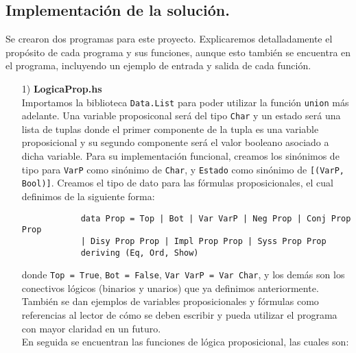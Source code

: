 \documentclass[letterpaper,11pt]{article}
\begin{document}
    \subsection{Implementación de la solución.}
    Se crearon dos programas para este proyecto. Explicaremos detalladamente el 
    propósito de cada programa y sus funciones, aunque esto también se 
    encuentra en el programa, incluyendo un ejemplo de entrada y salida de 
    cada función.
    \begin{itemize}
        \item[1)] \textbf{LogicaProp.hs} \\
        Importamos la biblioteca \texttt{Data.List} para poder utilizar 
        la función \texttt{union} más adelante. Una variable proposiconal 
        será del tipo \texttt{Char} y un estado será una lista de tuplas donde 
        el primer componente de la tupla es una variable proposicional y su 
        segundo componente será el valor booleano asociado a dicha variable.
        Para su implementación funcional, creamos los sinónimos de tipo para 
        \texttt{VarP} como sinónimo de \texttt{Char}, y \texttt{Estado} como 
        sinónimo de \texttt{[(VarP, Bool)]}. Creamos el tipo de dato para las 
        fórmulas proposicionales, el cual definimos de la siguiente forma:

        \begin{lstlisting}
            data Prop = Top | Bot | Var VarP | Neg Prop | Conj Prop Prop 
            | Disy Prop Prop | Impl Prop Prop | Syss Prop Prop 
            deriving (Eq, Ord, Show)
        \end{lstlisting}

        donde \texttt{Top = True}, \texttt{Bot = False}, 
        \texttt{Var VarP = Var Char}, y los demás son los conectivos lógicos
        (binarios y unarios) que ya definimos anteriormente. \\
        También se dan ejemplos de variables proposicionales y fórmulas 
        como referencias al lector de cómo se deben escribir y pueda utilizar 
        el programa con mayor claridad en un futuro. \\ 
        En seguida se encuentran las funciones de lógica proposicional, las
        cuales son:


\end{itemize}
\end{document}
